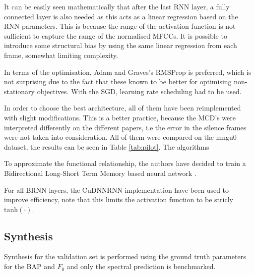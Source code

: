 \documentclass[a4paper]{article}
\begin{document}
It can be easily seen mathematically that after the last RNN layer, a fully connected layer is also needed as this acts as a linear regression based on the RNN parameters. This is because the range of the activation function is not sufficient to capture the range of the normalised MFCCs. It is possible to introduce some structural bias by using the same linear regression from each frame, somewhat limiting complexity. 

In terms of the optimisation, Adam and Graves's RMSProp is preferred, which is not surprising due to the
fact that these known to be better for optimising non-stationary objectives. With the SGD,
learning rate scheduling had to be used.

In order to choose the best architecture, all of them have been reimplemented with slight modifications.
This is a better practice, because the MCD's were interpreted differently on the different papers, i.e the error in the silence frames were not taken into consideration. All of them were compared on the mngu0 dataset, the results can be seen in Table  \ref{tab:pilot}. The algorithms


To approximate the functional relationship, the authors have decided to
train a Bidirectional Long-Short Term Memory based neural network \cite{Hochreiter1997}. 

For all BRNN layers, the CuDNNRNN implementation have been used to
improve efficiency, note that this limits the activation function to be
stricly \( \text{tanh}(\cdot) \).



\subsection{Synthesis}

Synthesis for the validation set is performed using the ground truth
parameters for the BAP and $ F_0 $ and only the spectral prediction is
benchmarked.
\end{document}
